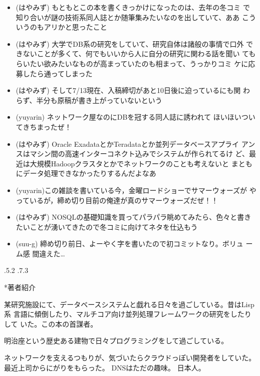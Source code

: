 \documentclass[b5paper,papersize,tombow,11pt]{jsbook}
\makeatletter
\renewcommand{\section}{%
  \if@slide\clearpage\fi
  \@startsection{section}{1}{\z@}%
  {\Cvs \@plus.5\Cdp \@minus.2\Cdp}%
  {.7\Cvs \@plus.3\Cdp}%
  {\normalfont\Large\headfont\raggedright}}
\makeatother
\begin{document}
\begin{itemize}
 \item (はやみず) もともとこの本を書くきっかけになったのは、去年の冬コミ
       で知り合いが謎の技術系同人誌とか随筆集みたいなのを出していて、ああ
       こういうのもアリかと思ったこと
 \item (はやみず) 大学でDB系の研究をしていて、研究自体は諸般の事情で口外
       できないことが多くて、何でもいいから人に自分の研究に関わる話を聞い
       てもらいたい欲みたいなものが高まっていたのも相まって、うっかりコミ
       ケに応募したら通ってしまった
 \item (はやみず) そして7/13現在、入稿締切があと10日後に迫っているにも関
       わらず、半分も原稿が書き上がっていないという
 \item (yuyarin) ネットワーク屋なのにDBを冠する同人誌に誘われて
       ほいほいついてきちまったぜ！
 \item (はやみず) Oracle ExadataとかTeradataとか並列データベースアプライ
       アンスはマシン間の高速インターコネクト込みでシステムが作られてるけ
       ど、最近は大規模Hadoopクラスタとかでネットワークのことも考えないと
       まともにデータ処理できなかったりするんだよなあ
 \item (yuyarin)この雑談を書いている今，金曜ロードショーでサマーウォーズが
       やっているが，締め切り目前の俺達が真のサマーウォーズだぜ！！
 \item (はやみず) NOSQLの基礎知識を買ってパラパラ眺めてみたら、色々と書き
	   たいことが湧いてきたので冬コミに向けてネタを仕込もう
 \item (suu-g) 締め切り前日、よーやく字を書いたので初コミットなり。ボリュ
       ーム感 間違えた…
\end{itemize}

\normalsize

\newpage

\plainifnotempty

\section*{著者紹介}

 \quad
某研究施設にて、データベースシステムと戯れる日々を過ごしている。昔はLisp系
言語に傾倒したり、マルチコア向け並列処理フレームワークの研究をしたりして
いた。この本の首謀者。

 \quad
明治座という歴史ある建物で日々プログラミングをして過ごしている。

 \quad
ネットワークを支えるつもりが、気づいたらクラウドっぽい開発者をしていた。
最近上司からにがりをもらった。 DNSはただの趣味。
日本人。
\end{document}
